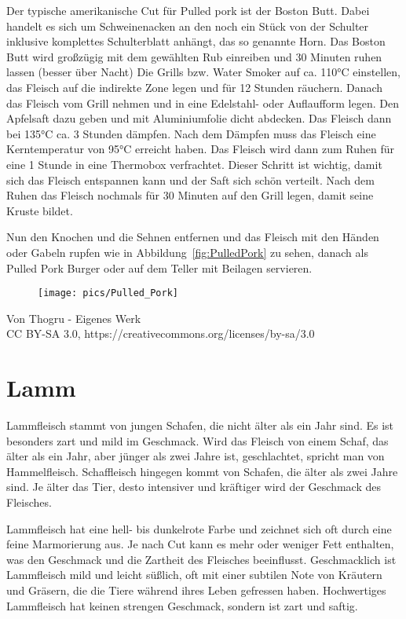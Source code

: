 Der typische amerikanische Cut für Pulled pork ist der Boston Butt. Dabei 
handelt es sich um Schweinenacken an den noch ein Stück von der 
Schulter  inklusive komplettes Schulterblatt anhängt, das so genannte 
Horn.
Das Boston Butt wird großzügig mit dem gewählten Rub einreiben und 30 
Minuten ruhen lassen (besser über Nacht) Die Grills bzw. Water Smoker 
auf ca. 110°C einstellen, das Fleisch auf die indirekte Zone legen und für 
12 Stunden räuchern. Danach das Fleisch vom Grill nehmen und in eine 
Edelstahl- oder Auflaufform legen. Den Apfelsaft dazu geben und mit 
Aluminiumfolie dicht abdecken. Das Fleisch dann bei 135°C ca. 3 Stunden 
dämpfen. Nach dem Dämpfen muss das Fleisch eine Kerntemperatur von 
95°C erreicht haben. Das Fleisch wird dann zum Ruhen für eine 1 Stunde 
in eine Thermobox verfrachtet. Dieser Schritt ist wichtig, damit sich das
Fleisch entspannen kann und der Saft sich schön verteilt. Nach dem 
Ruhen das Fleisch nochmals für 30 Minuten auf den Grill legen, damit 
seine Kruste bildet.

Nun den Knochen und die Sehnen entfernen und das Fleisch mit den 
Händen oder Gabeln rupfen wie in Abbildung~\vref{fig:PulledPork} zu 
sehen, danach als Pulled Pork Burger oder auf dem Teller mit Beilagen 
servieren.
\newpage
\begin{figure}[htbp]
		\centering
		\begin{minipage}{1\textwidth}
		\centering
		\texttt{[image: pics/Pulled\_Pork]}
		\label{fig:PulledPork}
	\end{minipage}
\end{figure}
Von Thogru - Eigenes Werk\\
CC BY-SA 3.0, https://creativecommons.org/licenses/by-sa/3.0
\newpage

\section{Lamm}

Lammfleisch stammt von jungen Schafen, die nicht älter als ein Jahr sind. Es ist besonders zart und mild im Geschmack. 
Wird das Fleisch von einem Schaf, das älter als ein Jahr, aber jünger als zwei Jahre ist, geschlachtet, spricht man von 
Hammelfleisch. Schaffleisch hingegen kommt von Schafen, die älter als zwei Jahre sind. Je älter das Tier, desto intensiver
und kräftiger wird der Geschmack des Fleisches.

Lammfleisch hat eine hell- bis dunkelrote Farbe und zeichnet sich oft durch eine feine Marmorierung aus. Je nach Cut kann
es mehr oder weniger Fett enthalten, was den Geschmack und die Zartheit des Fleisches beeinflusst. Geschmacklich ist
Lammfleisch mild und leicht süßlich, oft mit einer subtilen Note von Kräutern und Gräsern, die die Tiere während ihres Leben
gefressen haben. Hochwertiges Lammfleisch hat keinen strengen Geschmack, sondern ist zart und saftig.

